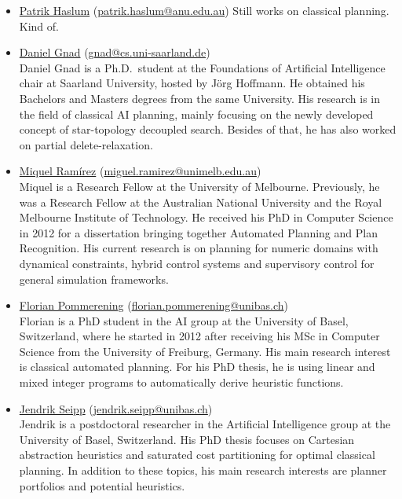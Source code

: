 \documentclass[10pt]{article}
\begin{document}
\begin{itemize}

\item \href{https://users.cecs.anu.edu.au/~patrik/}{Patrik Haslum}
(\href{mailto:patrik.haslum@anu.edu.au}{patrik.haslum@anu.edu.au})
Still works on classical planning. Kind of.

\item \href{http://}{Daniel Gnad}
(\href{mailto:gnad@cs.uni-saarland.de}{gnad@cs.uni-saarland.de})\\
Daniel Gnad is a Ph.D.\ student at the Foundations of Artificial
Intelligence chair at Saarland University, hosted by J\"org
Hoffmann. He obtained his Bachelors and Masters degrees from the same
University. His research is in the field of classical AI planning,
mainly focusing on the newly developed concept of star-topology
decoupled search. Besides of that, he has also worked on partial
delete-relaxation.

\item \href{http://findanexpert.unimelb.edu.au/display/person778610#tab-overview}{Miquel Ram\'{i}rez}
(\href{mailto:miguel.ramirez@unimelb.edu.au}{miguel.ramirez@unimelb.edu.au})\\
Miquel is a Research Fellow at the University of Melbourne. Previously, he was
a Research Fellow at the Australian National University and the Royal Melbourne
Institute of Technology. He
received his PhD in Computer Science in 2012 for a dissertation
bringing together Automated Planning and Plan Recognition. His current
research is on planning for numeric domains with dynamical constraints, hybrid control
systems and supervisory control for general simulation frameworks.

 \item \href{http://ai.cs.unibas.ch/people/pommeren}{Florian Pommerening}
   (\href{mailto:florian.pommerening@unibas.ch}{florian.pommerening@unibas.ch})\\
   Florian is a PhD student in the AI group at the University of Basel,
   Switzerland, where he started in 2012 after receiving his MSc in
   Computer Science from the University of Freiburg, Germany. His main
   research interest is classical automated planning. For his PhD
   thesis, he is using linear and mixed integer programs to
   automatically derive heuristic functions.

 \item \href{http://ai.cs.unibas.ch/people/seipp}{Jendrik Seipp}
   (\href{mailto:jendrik.seipp@unibas.ch}{jendrik.seipp@unibas.ch})\\
   Jendrik is a postdoctoral researcher in the Artificial Intelligence
   group at the University of Basel, Switzerland. His PhD thesis focuses
   on Cartesian abstraction heuristics and saturated cost partitioning
   for optimal classical planning. In addition to these topics, his main
   research interests are planner portfolios and potential heuristics.


\end{itemize}
\end{document}
